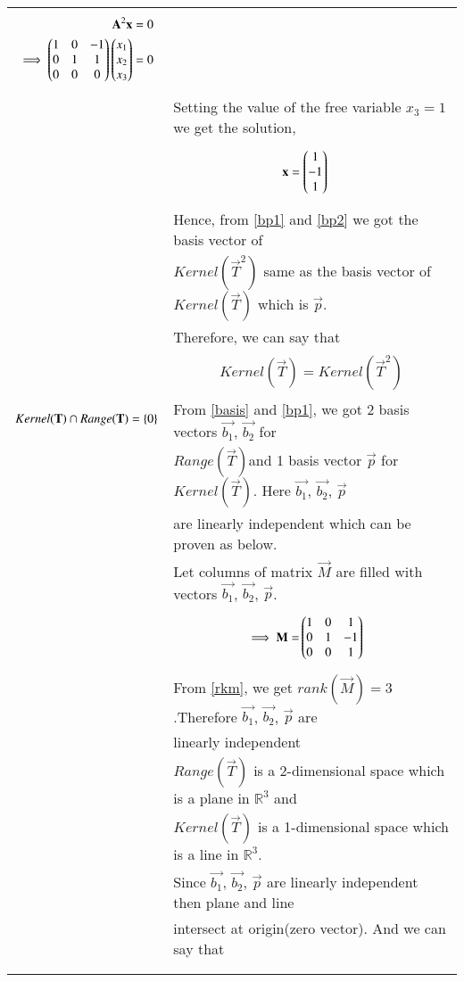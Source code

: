\documentclass[journal,12pt]{IEEEtran}
\begin{document}
\begin{longtable}{|l|l|}
{\begin{align}
\mathbf{A}^2\mathbf{x} &= 0\\
\implies\begin{pmatrix}1&0&-1\\0&1&1\\0&0&0\end{pmatrix}\begin{pmatrix}x_1\\x_2\\x_3\end{pmatrix} &= 0
\end{align}}\\&Setting the value of the free variable $x_3 = 1$ we get the solution,\\&\parbox{11cm}{
\begin{align}
\mathbf{x} &= \begin{pmatrix}1\\-1\\1\end{pmatrix}\label{bp2}
\end{align}}\\&Hence, from \eqref{bp1} and \eqref{bp2} we got the basis vector of\\&$Kernel(\vec{T}^2)$ same as the basis vector of $Kernel(\vec{T})$ which is $\vec{p}$.\\&Therefore, we can say that\\&\parbox{11cm}{\begin{align}
    Kernel(\vec{T})=Kernel(\vec{T}^2)\label{exp2}
\end{align}}\\
\hline
$Kernel(\mathbf{T})\cap Range(\mathbf{T})=\left\{0\right\}$&From \eqref{basis} and \eqref{bp1}, we got 2 basis vectors $\vec{b_1}$, $\vec{b_2}$ for \\&$Range(\vec{T})$and 1 basis vector $\vec{p}$ for $Kernel(\vec{T})$. Here $\vec{b_1}$, $\vec{b_2}$, $\vec{p}$\\&are linearly independent which can be proven as below.\\&Let columns of matrix $\vec{M}$ are filled with vectors $\vec{b_1}$, $\vec{b_2}$, $\vec{p}$.\\&\parbox{11cm}{\begin{align}
    \implies\mathbf{M}=&\begin{pmatrix}1&0&1\\0&1&-1\\0&0&1\end{pmatrix}\label{rkm}
\end{align}}\\&From \eqref{rkm}, we get $rank(\vec{M})=3$.Therefore $\vec{b_1}$, $\vec{b_2}$, $\vec{p}$ are\\&linearly independent\\&$Range(\vec{T})$ is a 2-dimensional space which is a plane in $\mathbb{R}^3$ and\\&$Kernel(\vec{T})$ is a 1-dimensional space which is a line in $\mathbb{R}^3$.\\&Since $\vec{b_1}$, $\vec{b_2}$, $\vec{p}$ are linearly independent then plane and line \\&intersect at origin(zero vector). And we can say that\\&\parbox{11cm}{\begin{align}

\end{align}}
\end{longtable}
\end{document}
